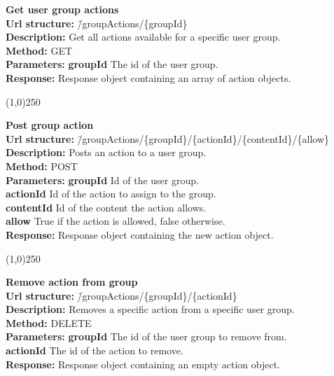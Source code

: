\documentclass[11pt]{article}
\begin{document}
\begin{tabbing}
\textbf{Get user group actions} \\
\textcolor{black!60}{\textbf{Url structure:}} \hspace{0.2in} \= /groupActions/\{groupId\} \\
\textcolor{black!60}{\textbf{Description:}}  \> Get all actions available for a specific user group. \\
\textcolor{black!60}{\textbf{Method:}} \> GET \\
\textcolor{black!60}{\textbf{Parameters:}} \> \textbf{groupId} The id of the user group. \\
\textcolor{black!60}{\textbf{Response:}} \> Response object containing an array of action objects.
\end{tabbing}

\begin{center}\line(1,0){250}\end{center}

\begin{tabbing}
\textbf{Post group action} \\
\textcolor{black!60}{\textbf{Url structure:}} \hspace{0.2in} \= /groupActions/\{groupId\}/\{actionId\}/\{contentId\}/\{allow\} \\
\textcolor{black!60}{\textbf{Description:}}  \> Posts an action to a user group. \\
\textcolor{black!60}{\textbf{Method:}} \> POST \\
\textcolor{black!60}{\textbf{Parameters:}} \> \textbf{groupId} Id of the user group. \\
\> \textbf{actionId} Id of the action to assign to the group. \\
\> \textbf{contentId} Id of the content the action allows. \\
\> \textbf{allow} True if the action is allowed, false otherwise. \\
\textcolor{black!60}{\textbf{Response:}} \> Response object containing the new action object.
\end{tabbing}

\begin{center}\line(1,0){250}\end{center}

\begin{tabbing}
\textbf{Remove action from group} \\
\textcolor{black!60}{\textbf{Url structure:}} \hspace{0.2in} \= /groupActions/\{groupId\}/\{actionId\} \\
\textcolor{black!60}{\textbf{Description:}}  \> Removes a specific action from a specific user group. \\
\textcolor{black!60}{\textbf{Method:}} \> DELETE \\
\textcolor{black!60}{\textbf{Parameters:}} \> \textbf{groupId} The id of the user group to remove from. \\
\> \textbf{actionId} The id of the action to remove. \\
\textcolor{black!60}{\textbf{Response:}} \> Response object containing an empty action object.
\end{tabbing}
\end{document}

